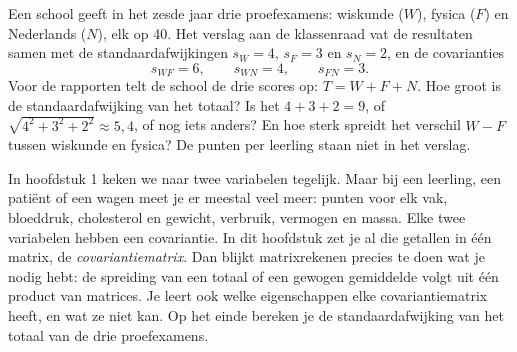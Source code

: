 %


\begin{probleem}
Een school geeft in het zesde jaar drie proefexamens: wiskunde ($W$), fysica ($F$) en Nederlands ($N$), elk op 40. Het verslag aan de klassenraad vat de resultaten samen met de standaardafwijkingen $s_W = 4$, $s_F = 3$ en $s_N = 2$, en de covarianties
\[ s_{WF} = 6, \qquad s_{WN} = 4, \qquad s_{FN} = 3 . \]
Voor de rapporten telt de school de drie scores op: $T = W + F + N$. Hoe groot is de standaardafwijking van het totaal? Is het $4 + 3 + 2 = 9$, of $\sqrt{4^2 + 3^2 + 2^2} \approx 5{,}4$, of nog iets anders? En hoe sterk spreidt het verschil $W - F$ tussen wiskunde en fysica? De punten per leerling staan niet in het verslag.
\end{probleem}


In hoofdstuk 1 keken we naar twee variabelen tegelijk. Maar bij een leerling, een patiënt of een wagen meet je er meestal veel meer: punten voor elk vak, bloeddruk, cholesterol en gewicht, verbruik, vermogen en massa. Elke twee variabelen hebben een covariantie. In dit hoofdstuk zet je al die getallen in één matrix, de \textit{covariantiematrix}. Dan blijkt matrixrekenen precies te doen wat je nodig hebt: de spreiding van een totaal of een gewogen gemiddelde volgt uit één product van matrices. Je leert ook welke eigenschappen elke covariantiematrix heeft, en wat ze niet kan. Op het einde bereken je de standaardafwijking van het totaal van de drie proefexamens.

